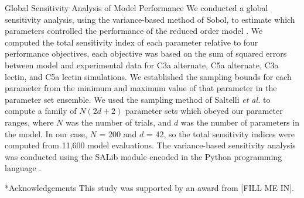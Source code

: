 \documentclass[12pt]{article}
\makeatletter
\renewcommand\subsection{\@startsection
	{subsection}{2}{0mm}
	{-0.05in}
	{-0.5\baselineskip}
	{\normalfont\normalsize\bfseries}}
\renewcommand\section{\@startsection
	{subsection}{2}{0mm}
	{-0.2in}
	{0.05\baselineskip}
	{\normalfont\large\bfseries}}
\makeatother
\begin{document}
\subsection{Global Sensitivity Analysis of Model Performance}
We conducted a global sensitivity analysis, using the variance-based method of Sobol, to estimate which parameters controlled the performance of the reduced order model \citep{SOBOL_METHOD}. We computed the total sensitivity index of each parameter relative to four performance objectives, each objective was based on the sum of squared errors between model and experimental data for C3a alternate, C5a alternate, C3a lectin, and C5a lectin simulations.
We established the sampling bounds for each parameter from the minimum and maximum value of that parameter in the parameter set ensemble.
We used the sampling method of Saltelli \textit{et al.} \citep{Saltelli:2010} to compute a family of $N\left(2d+2\right)$ parameter sets which obeyed our parameter ranges,
where $N$ was the number of trials, and $d$ was the number of parameters in the model. In our case, $N$ = 200 and $d$ = 42, so the total sensitivity indices were computed from
11,600 model evaluations. The variance-based sensitivity analysis was conducted using the SALib module encoded in the Python programming language \citep{SALIB}.

\clearpage


\section*{Acknowledgements}
This study was supported by an award from [FILL ME IN].
\clearpage




\clearpage

\end{document}
